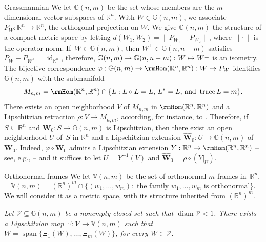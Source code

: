 \documentclass[JEP,XML,SOM,Unicode,ThmDefs,NoEqCountersInSection]{cedram}
\newcommand\mto{\mathchoice{\longmapsto}{\mapsto}{\mapsto}{\mapsto}}
\newenvironment{Empty}[2][\null]{%
\begin{enonce}[remark]{#1}#2}
{\end{enonce}}
\newcommand{\R}{\mathbb{R}}
\newcommand{\Rn}{\R^n}
\newcommand{\calV}{\mathscr{V}}
\newcommand{\bW}{{\boldsymbol{W}}}
\newcommand{\bV}{\mathbb{V}}
\newcommand{\bG}{\mathbb{G}}
\let\bY Y
\DeclareMathOperator{\rmdiam}{\mathrm{diam}}
\DeclareMathOperator{\rmid}{\mathrm{id}}
\DeclareMathOperator{\rmspan}{\mathrm{span}}
\DeclareMathOperator{\rmtrace}{\mathrm{trace}}
\let\vphi\varphi
\let\wh\widehat
\let\subset\subseteq
\begin{document}
\begin{Empty}[Grassmannian]
\label{grassmann}
We let $\bG(n,m)$ be the set whose members are the $m$-dimensional vector subspaces of $\Rn$.
With $W \in \bG(n,m)$, we associate $P_W: \Rn \to \Rn$, the orthogonal projection on $W$.
We give $\bG(n,m)$ the structure of a compact metric space by letting $d(W_1,W_2) = \|P_{W_1}-P_{W_2}\|$, where $\|\cdot\|$ is the operator norm.
If~$W \in \bG(n,m)$, then $W^\perp \in \bG(n,n-m)$ satisfies $P_W + P_{W^\perp}=\rmid_{\Rn}$, therefore, $\bG(n,m) \to \bG(n,n-m): W \mto W^\perp$ is an isometry.
The bijective correspondence $\vphi:\bG(n,m) \to \rmHom(\Rn,\Rn): W \mto P_W$ identifies $\bG(n,m)$ with the submanifold
\[
M_{n,m} = \rmHom(\Rn,\Rn) \cap \{ L: L \circ L = L,\, L^*=L \text{, and } \rmtrace L = m \}.
\]
There exists an open neighborhood $V$ of $M_{n,m}$ in $\rmHom(\Rn,\Rn)$ and a Lipschitzian retraction $\rho: V \to M_{n,m}$, according, for instance, to \cite[3.1.20]{GMT}.
Therefore, if $S \subset \Rn$ and $\bW_0: S \to \bG(n,m)$ is Lipschitzian, then there exist an open neighborhood $U$ of~$S$ in $\Rn$ and a Lipschitzian extension $\wh{\bW}_0: U \to \bG(n,m)$ of $\bW_0$.
Indeed, $\vphi \circ \bW_0$ admits a Lipschitzian extension $\bY: \Rn \to \rmHom(\Rn,\Rn)$ -- see, e.g., \cite[2.10.43]{GMT} -- and it suffices to let $U = \bY^{-1}(V)$ and $\wh{\bW}_0 = \rho \circ \left(\bY |_U \right)$.
\end{Empty}

\begin{Empty}[Orthonormal frames]
\label{stiefel}
We let $\bV(n,m)$ be the set of orthonormal $m$-frames in~$\Rn$, \ie
\[
\bV(n,m) = (\Rn)^{m} \cap\{ (w_1,\ldots,w_{m}): \text{ the family } w_1,\ldots,w_{m} \text{ is orthonormal}\}.
\]
We will consider it as a metric space, with its structure inherited from $(\Rn)^{m}$.
\end{Empty}

\begin{Empty}[]
\label{grass.param.stief}
{\it
Let $\calV \subset \bG(n,m)$ be a nonempty closed set such that $\rmdiam \calV < 1$. There exists a Lipschitzian map $\Xi: \calV \to \bV(n,m)$ such that $W = \rmspan \{ \Xi_1(W),\ldots,\Xi_m(W)\}$, for every $W \in \calV$.
}
\end{Empty}
\end{document}
